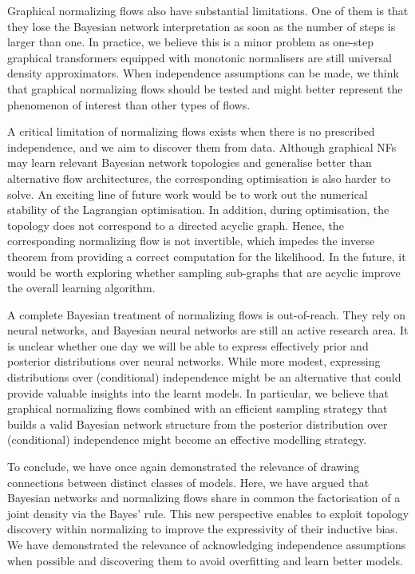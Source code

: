 Graphical normalizing flows also have substantial limitations. One of them is that they lose the Bayesian network interpretation as soon as the number of steps is larger than one. In practice, we believe this is a minor problem as one-step graphical transformers equipped with monotonic normalisers are still universal density approximators. When independence assumptions can be made, we think that graphical normalizing flows should be tested and might better represent the phenomenon of interest than other types of flows.

A critical limitation of normalizing flows exists when there is no prescribed independence, and we aim to discover them from data. Although graphical NFs may learn relevant Bayesian network topologies and generalise better than alternative flow architectures, the corresponding optimisation is also harder to solve. An exciting line of future work would be to work out the numerical stability of the Lagrangian optimisation. In addition, during optimisation, the topology does not correspond to a directed acyclic graph. Hence, the corresponding normalizing flow is not invertible, which impedes the inverse theorem from providing a correct computation for the likelihood. In the future, it would be worth exploring whether sampling sub-graphs that are acyclic improve the overall learning algorithm.

A complete Bayesian treatment of normalizing flows is out-of-reach. They rely on neural networks, and Bayesian neural networks are still an active research area. It is unclear whether one day we will be able to express effectively prior and posterior distributions over neural networks. While more modest, expressing distributions over (conditional) independence might be an alternative that could provide valuable insights into the learnt models. In particular, we believe that graphical normalizing flows combined with an efficient sampling strategy that builds a valid Bayesian network structure from the posterior distribution over (conditional) independence might become an effective modelling strategy.

To conclude, we have once again demonstrated the relevance of drawing connections between distinct classes of models. Here, we have argued that Bayesian networks and normalizing flows share in common the factorisation of a joint density via the Bayes' rule. This new perspective enables to exploit topology discovery within normalizing to improve the expressivity of their inductive bias. We have demonstrated the relevance of acknowledging independence assumptions when possible and discovering them to avoid overfitting and learn better models.


